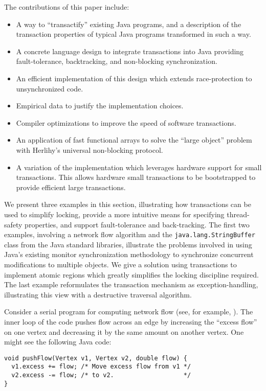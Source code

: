 \documentclass[preprint]{rdbacmconf}
\begin{document}
The contributions of this paper include:
\begin{itemize}
\item A way to ``transactify'' existing Java programs, and a
  description of the transaction properties of typical Java programs
  transformed in such a way.
\item A concrete language design to integrate transactions into Java
  providing fault-tolerance, backtracking, and non-blocking
  synchronization.
\item An efficient implementation of this design which extends
  race-protection to unsynchronized code.
\item Empirical data to justify the implementation choices.
\item Compiler optimizations to improve the speed of software
  transactions.
\item An application of fast functional arrays to solve the ``large
  object'' problem with Herlihy's universal non-blocking protocol.
\item A variation of the implementation which leverages hardware
  support for small transactions.  This allows hardware small
  transactions to be bootstrapped to provide efficient large
  transactions.
\end{itemize}

We present three examples in this section, illustrating how
transactions can be used to simplify locking, provide a more intuitive
means for specifying thread-safety properties, and support
fault-tolerance and back-tracking.  The first two examples, involving
a network flow algorithm and the \texttt{java.lang.StringBuffer} class
from the Java standard libraries, illustrate the problems involved in
using Java's existing monitor synchronization methodology to
synchronize concurrent modifications to multiple objects.  We give a
solution using transactions to implement atomic regions which greatly
simplifies the locking discipline required.
The last example reformulates the transaction mechanism as
exception-handling, illustrating this view with a destructive traversal
algorithm. 


Consider a serial program for computing network flow (see, for
example, \cite[Chapter 26]{CormenLeRi01}).  The inner loop of the code
pushes flow across an edge by increasing the ``excess flow'' on one
vertex and decreasing it by the same amount on another vertex.  One
might see the following Java code: \par {\footnotesize\samepage
\begin{verbatim}
void pushFlow(Vertex v1, Vertex v2, double flow) {
  v1.excess += flow; /* Move excess flow from v1 */
  v2.excess -= flow; /* to v2.                   */
}
\end{verbatim}
}
\end{document}
